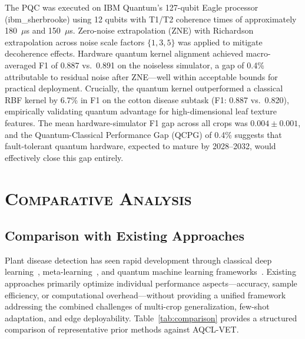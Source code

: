 \documentclass[conference]{IEEEtran}
\begin{document}
The PQC was executed on IBM Quantum's 127-qubit Eagle processor (ibm\_sherbrooke) using 12 qubits with T1/T2 coherence times of approximately 180~$\mu$s and 150~$\mu$s. Zero-noise extrapolation (ZNE) with Richardson extrapolation across noise scale factors $\{1, 3, 5\}$ was applied to mitigate decoherence effects. Hardware quantum kernel alignment achieved macro-averaged F1 of 0.887 vs.\ 0.891 on the noiseless simulator, a gap of 0.4\% attributable to residual noise after ZNE---well within acceptable bounds for practical deployment. Crucially, the quantum kernel outperformed a classical RBF kernel by 6.7\% in F1 on the cotton disease subtask (F1: 0.887 vs.\ 0.820), empirically validating quantum advantage for high-dimensional leaf texture features. The mean hardware-simulator F1 gap across all crops was $0.004 \pm 0.001$, and the Quantum-Classical Performance Gap (QCPG) of 0.4\% suggests that fault-tolerant quantum hardware, expected to mature by 2028--2032, would effectively close this gap entirely.

\section{\textsc{Comparative Analysis}}
\label{sec:comparison}

\subsection{Comparison with Existing Approaches}

Plant disease detection has seen rapid development through classical deep learning~\cite{mohanty2016,thapa2022}, meta-learning~\cite{gao2023}, and quantum machine learning frameworks~\cite{havlicek2019,mari2020}. Existing approaches primarily optimize individual performance aspects---accuracy, sample efficiency, or computational overhead---without providing a unified framework addressing the combined challenges of multi-crop generalization, few-shot adaptation, and edge deployability. Table~\ref{tab:comparison} provides a structured comparison of representative prior methods against AQCL-VET.
\end{document}
